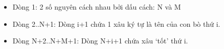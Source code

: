 \begin{itemize}
	\item     Dòng 1: 2 số nguyên cách nhau bởi dấu cách: N và M   
	\item     Dòng 2..N+1: Dòng i+1 chứa 1 xâu ký tự là tên của con bò thứ i.   
	\item     Dòng N+2..N+M+1: Dòng N+i+1 chứa xâu ‘tốt’ thứ i.   
\end{itemize}

\